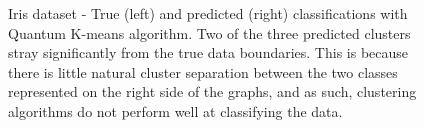 \documentclass[twocolumn, english]{revtex4-2}
\begin{document}
\begin{figure}
\caption{Iris dataset - True (left) and predicted (right) classifications with Quantum K-means algorithm. Two of the three predicted clusters stray significantly from the true data boundaries. This is because there is little natural cluster separation between the two classes represented on the right side of the graphs, and as such, clustering algorithms do not perform well at classifying the data.}
\end{figure}
\end{document}
